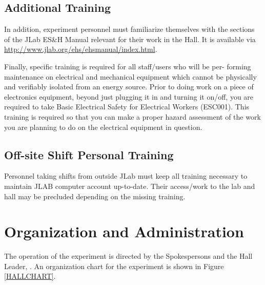 \documentclass[11pt]{article}
\begin{document}
\subsection{Additional Training}
In addition, experiment personnel must familiarize themselves with the 
sections of the JLab ES\&H Manual relevant for their work in the Hall.  It is
available via \url{http://www.jlab.org/ehs/ehsmanual/index.html}.

Finally, specific training is required for all staff/users who will be per- forming maintenance on electrical and 
mechanical equipment which cannot be physically and verifiably isolated from an energy source. Prior to 
doing work on a piece of electronics equipment, beyond just plugging it in and turning it on/off, you are 
required to take Basic Electrical Safety for Electrical Workers (ESC001). This training is required so 
that you can make a proper hazard assessment of the work you are planning to do on the electrical 
equipment in question.


\subsection{Off-site Shift Personal Training}
Personnel taking shifts from outside JLab must keep all training necessary to maintain JLAB computer 
account up-to-date. Their access/work to the lab and hall may be precluded depending on the missing training.

\section{ Organization  and Administration}
\indent

The operation of the experiment is directed by the Spokespersons and the Hall 
Leader, \HALLLEADER. An organization chart for the experiment is
shown in Figure \ref{HALLCHART}.
\end{document}
